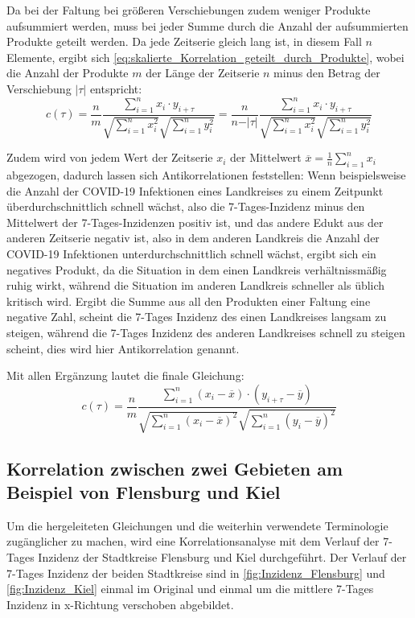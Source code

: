 Da bei der Faltung bei größeren Verschiebungen zudem weniger Produkte aufsummiert werden, muss bei jeder Summe durch die Anzahl der aufsummierten Produkte geteilt werden. Da jede Zeitserie gleich lang ist, in diesem Fall $n$ Elemente, ergibt sich \autoref{eq:skalierte_Korrelation_geteilt_durch_Produkte}, wobei die Anzahl der Produkte $m$ der Länge der Zeitserie $n$ minus den Betrag der Verschiebung $\vert\tau\vert$ entspricht:
\begin{equation}\label{eq:skalierte_Korrelation_geteilt_durch_Produkte}
    c(\tau) =\frac{n}{m} \frac{\sum_{i=1}^n x_i\cdot y_{i+\tau}}{\sqrt{\sum_{i=1}^n x_i^2}\sqrt{\sum_{i=1}^n y_i^2}}=
    \frac{n}{n-\vert\tau\vert} \frac{\sum_{i=1}^n x_i\cdot y_{i+\tau}}{\sqrt{\sum_{i=1}^n x_i^2}\sqrt{\sum_{i=1}^n y_i^2}}
\end{equation}

Zudem wird von jedem Wert der Zeitserie $x_i$ der Mittelwert $\overline x = \frac{1}{n}\sum_{i=1}^n x_i$ abgezogen, dadurch lassen sich Antikorrelationen feststellen: Wenn beispielsweise die Anzahl der COVID-19 Infektionen eines Landkreises zu einem Zeitpunkt überdurchschnittlich schnell wächst, also die 7-Tages-Inzidenz minus den Mittelwert der 7-Tages-Inzidenzen positiv ist, und das andere Edukt aus der anderen Zeitserie negativ ist, also in dem anderen Landkreis die Anzahl der COVID-19 Infektionen unterdurchschnittlich schnell wächst, ergibt sich ein negatives Produkt, da die Situation in dem einen Landkreis verhältnissmäßig ruhig wirkt, während die Situation im anderen Landkreis schneller als üblich kritisch wird. Ergibt die Summe aus all den Produkten einer Faltung eine negative Zahl, scheint die 7-Tages Inzidenz des einen Landkreises langsam zu steigen, während die 7-Tages Inzidenz des anderen Landkreises schnell zu steigen scheint, dies wird hier Antikorrelation genannt.

Mit allen Ergänzung lautet die finale Gleichung:
\begin{equation}\label{eq:komplette_skalierte_Korrelation}
    c(\tau) =\frac{n}{m}
    \frac{\sum_{i=1}^n (x_i-\overline x)\cdot (y_{i+\tau}-\overline y)}{\sqrt{\sum_{i=1}^n (x_i-\overline x)^2}\sqrt{\sum_{i=1}^n (y_i-\overline y)^2}}
\end{equation}

\subsection{Korrelation zwischen zwei Gebieten am Beispiel von Flensburg und Kiel}
Um die hergeleiteten Gleichungen und die weiterhin verwendete Terminologie zugänglicher zu machen, wird eine Korrelationsanalyse mit dem Verlauf der 7-Tages Inzidenz der Stadtkreise Flensburg und Kiel durchgeführt. Der Verlauf der 7-Tages Inzidenz der beiden Stadtkreise sind in \autoref{fig:Inzidenz_Flensburg} und \autoref{fig:Inzidenz_Kiel} einmal im Original und einmal um die mittlere 7-Tages Inzidenz in x-Richtung verschoben abgebildet.

